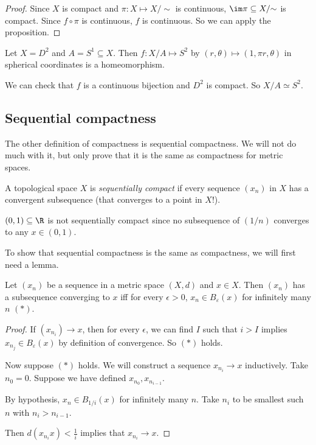 \documentclass[a4paper]{article}
\begin{document}
\begin{proof}
  Since $X$ is compact and $\pi: X\mapsto X/{\sim}$ is continuous, $\im \pi \subseteq X/{\sim}$ is compact. Since $f\circ \pi$ is continuous, $f$ is continuous. So we can apply the proposition.
\end{proof}

\begin{eg}
  Let $X = D^2$ and $A = S^1 \subseteq X$. Then $f: X/A \mapsto S^2$ by $(r, \theta) \mapsto (1, \pi r, \theta)$ in spherical coordinates is a homeomorphism.

  We can check that $f$ is a continuous bijection and $D^2$ is compact. So $X/A \simeq S^2$.
\end{eg}

\subsection{Sequential compactness}
The other definition of compactness is sequential compactness. We will not do much with it, but only prove that it is the same as compactness for metric spaces.

\begin{defi}
  A topological space $X$ is \emph{sequentially compact} if every sequence $(x_n)$ in $X$ has a convergent subsequence (that converges to a point in $X$!).
\end{defi}

\begin{eg}
  $(0, 1) \subseteq \R$ is not sequentially compact since no subsequence of $(1/n)$ converges to any $x\in (0, 1)$.
\end{eg}

To show that sequential compactness is the same as compactness, we will first need a lemma.
\begin{lemma}
  Let $(x_n)$ be a sequence in a metric space $(X, d)$ and $x\in X$. Then $(x_n)$ has a subsequence converging to $x$ iff for every $\epsilon > 0$, $x_n \in B_\varepsilon (x)$ for infinitely many $n$ $(*)$.
\end{lemma}

\begin{proof}
  If $(x_{n_i}) \to x$, then for every $\epsilon$, we can find $I$ such that $i > I$ implies $x_{n_j}\in B_\varepsilon (x)$ by definition of convergence. So $(*)$ holds.

  Now suppose $(*)$ holds. We will construct a sequence $x_{n_i} \to x$ inductively. Take $n_0 = 0$. Suppose we have defined $x_{n_0}, x_{n_{i - 1}}$.

  By hypothesis, $x_n \in B_{1/i}(x)$ for infinitely many $n$. Take $n_i$ to be smallest such $n$ with $n_i > n_{i - 1}$.

  Then $d(x_{n_i} x) < \frac{1}{i}$ implies that $x_{n_i} \to x$.
\end{proof}
\end{document}
